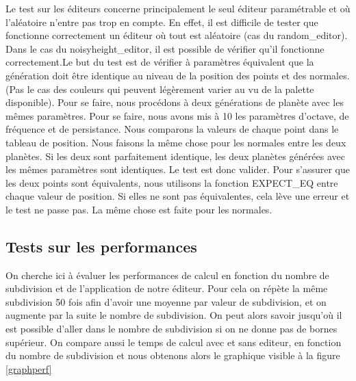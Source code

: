 \documentclass[a4paper]{article}
\begin{document}
Le test sur les éditeurs concerne principalement le seul éditeur paramétrable et où l'aléatoire n'entre pas trop en compte. En effet, il est difficile de tester que fonctionne correctement un éditeur où tout est aléatoire (cas du random\_editor). Dans le cas du noisyheight\_editor, il est possible de vérifier qu'il fonctionne correctement.Le but du test est de vérifier à paramètres équivalent que la génération doit être identique au niveau de la position des points et des normales. (Pas le cas des couleurs qui peuvent légèrement varier au vu de la palette disponible). Pour se faire, nous procédons à deux générations de planète avec les mêmes paramètres. Pour se faire, nous avons mis à 10 les paramètres d'octave, de fréquence et de persistance. Nous comparons la valeurs de chaque point dans le tableau de position. Nous faisons la même chose pour les normales entre les deux planètes. Si les deux sont parfaitement identique, les deux planètes générées avec les mêmes paramètres sont identiques. Le test est donc valider. Pour s'assurer que les deux points sont équivalents, nous utilisons la fonction EXPECT\_EQ entre chaque valeur de position. Si elles ne sont pas équivalentes, cela lève une erreur et le test ne passe pas. La même chose est faite pour les normales.

\subsection{Tests sur les performances}

On cherche ici à évaluer les performances de calcul en fonction du nombre de subdivision et de l'application de notre éditeur. Pour cela on répète la même subdivision 50 fois afin d'avoir une moyenne par valeur de subdivision, et on augmente par la suite le nombre de subdivision. On peut alors savoir jusqu'où il est possible d'aller dans le nombre de subdivision si on ne donne pas de bornes supérieur. On compare aussi le temps de calcul avec et sans editeur, en fonction du nombre de subdivision et nous obtenons alors le graphique visible à la figure \ref{graphperf}
\end{document}
